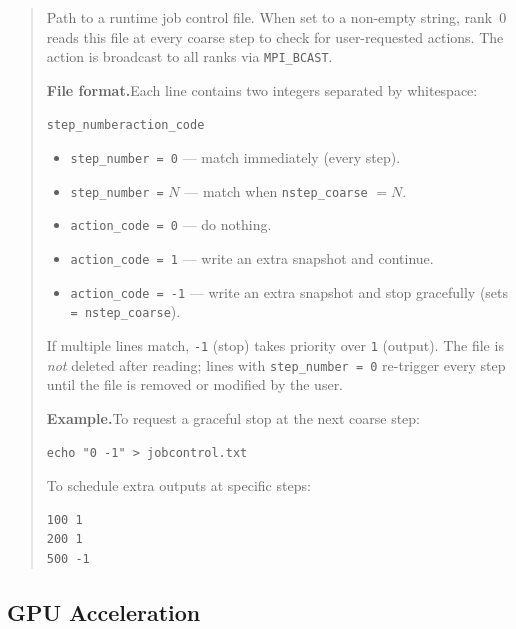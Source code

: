 \begin{quote}
Path to a runtime job control file.  When set to a non-empty string,
rank~0 reads this file at every coarse step to check for user-requested
actions.  The action is broadcast to all ranks via \texttt{MPI\_BCAST}.

\textbf{File format.}\quad  Each line contains two integers separated by
whitespace:
\begin{center}
\texttt{step\_number\quad action\_code}
\end{center}
\begin{itemize}[nosep]
  \item \texttt{step\_number = 0} --- match immediately (every step).
  \item \texttt{step\_number =} $N$ --- match when
        \texttt{nstep\_coarse} $= N$.
  \item \texttt{action\_code = 0} --- do nothing.
  \item \texttt{action\_code = 1} --- write an extra snapshot and continue.
  \item \texttt{action\_code = -1} --- write an extra snapshot and stop
        gracefully (sets \texttt{= nstep\_coarse}).
\end{itemize}
If multiple lines match, \texttt{-1} (stop) takes priority over
\texttt{1} (output).  The file is \emph{not} deleted after reading;
lines with \texttt{step\_number = 0} re-trigger every step until the
file is removed or modified by the user.

\textbf{Example.}\quad  To request a graceful stop at the next coarse step:
\begin{verbatim}
echo "0 -1" > jobcontrol.txt
\end{verbatim}
To schedule extra outputs at specific steps:
\begin{verbatim}
100 1
200 1
500 -1
\end{verbatim}

\end{quote}


\subsection{GPU Acceleration}

